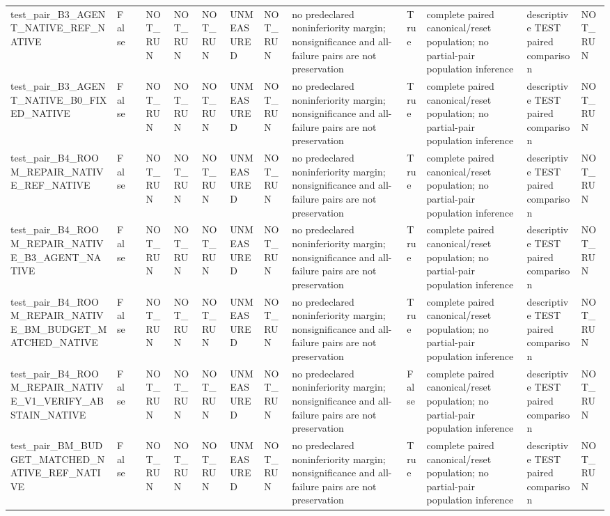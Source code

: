 \begin{tabular}{lllllllllllll}
test\_pair\_B3\_AGENT\_NATIVE\_REF\_NATIVE & False &  & NOT\_RUN & NOT\_RUN & NOT\_RUN & UNMEASURED & NOT\_RUN & no predeclared noninferiority margin; nonsignificance and all-failure pairs are not preservation & True & complete paired canonical/reset population; no partial-pair population inference & descriptive TEST paired comparison & NOT\_RUN \\
test\_pair\_B3\_AGENT\_NATIVE\_B0\_FIXED\_NATIVE & False &  & NOT\_RUN & NOT\_RUN & NOT\_RUN & UNMEASURED & NOT\_RUN & no predeclared noninferiority margin; nonsignificance and all-failure pairs are not preservation & True & complete paired canonical/reset population; no partial-pair population inference & descriptive TEST paired comparison & NOT\_RUN \\
test\_pair\_B4\_ROOM\_REPAIR\_NATIVE\_REF\_NATIVE & False &  & NOT\_RUN & NOT\_RUN & NOT\_RUN & UNMEASURED & NOT\_RUN & no predeclared noninferiority margin; nonsignificance and all-failure pairs are not preservation & True & complete paired canonical/reset population; no partial-pair population inference & descriptive TEST paired comparison & NOT\_RUN \\
test\_pair\_B4\_ROOM\_REPAIR\_NATIVE\_B3\_AGENT\_NATIVE & False &  & NOT\_RUN & NOT\_RUN & NOT\_RUN & UNMEASURED & NOT\_RUN & no predeclared noninferiority margin; nonsignificance and all-failure pairs are not preservation & True & complete paired canonical/reset population; no partial-pair population inference & descriptive TEST paired comparison & NOT\_RUN \\
test\_pair\_B4\_ROOM\_REPAIR\_NATIVE\_BM\_BUDGET\_MATCHED\_NATIVE & False &  & NOT\_RUN & NOT\_RUN & NOT\_RUN & UNMEASURED & NOT\_RUN & no predeclared noninferiority margin; nonsignificance and all-failure pairs are not preservation & True & complete paired canonical/reset population; no partial-pair population inference & descriptive TEST paired comparison & NOT\_RUN \\
test\_pair\_B4\_ROOM\_REPAIR\_NATIVE\_V1\_VERIFY\_ABSTAIN\_NATIVE & False &  & NOT\_RUN & NOT\_RUN & NOT\_RUN & UNMEASURED & NOT\_RUN & no predeclared noninferiority margin; nonsignificance and all-failure pairs are not preservation & False & complete paired canonical/reset population; no partial-pair population inference & descriptive TEST paired comparison & NOT\_RUN \\
test\_pair\_BM\_BUDGET\_MATCHED\_NATIVE\_REF\_NATIVE & False &  & NOT\_RUN & NOT\_RUN & NOT\_RUN & UNMEASURED & NOT\_RUN & no predeclared noninferiority margin; nonsignificance and all-failure pairs are not preservation & True & complete paired canonical/reset population; no partial-pair population inference & descriptive TEST paired comparison & NOT\_RUN \\
\end{tabular}
